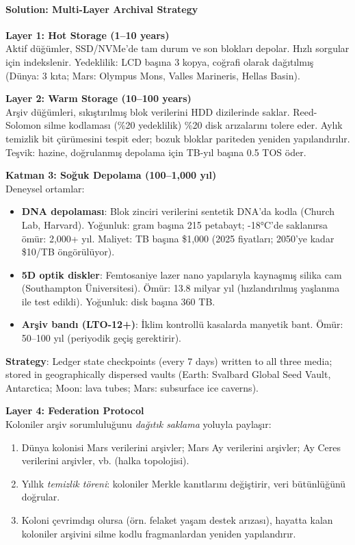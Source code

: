 \documentclass[11pt]{article}
\begin{document}
\paragraph{Solution: Multi-Layer Archival Strategy}

\textbf{Layer 1: Hot Storage (1--10 years)}\\
Aktif düğümler, SSD/NVMe'de tam durum ve son blokları depolar. Hızlı sorgular için indekslenir. Yedeklilik: LCD başına 3 kopya, coğrafi olarak dağıtılmış (Dünya: 3 kıta; Mars: Olympus Mons, Valles Marineris, Hellas Basin).

\textbf{Layer 2: Warm Storage (10--100 years)}\\
Arşiv düğümleri, sıkıştırılmış blok verilerini HDD dizilerinde saklar. Reed-Solomon silme kodlaması (\%20 yedeklilik) \%20 disk arızalarını tolere eder. Aylık temizlik bit çürümesini tespit eder; bozuk bloklar pariteden yeniden yapılandırılır. Teşvik: hazine, doğrulanmış depolama için TB-yıl başına 0.5 TOS öder.

\textbf{Katman 3: Soğuk Depolama (100--1,000 yıl)}\\
Deneysel ortamlar:
\begin{itemize}[noitemsep]
  \item \textbf{DNA depolaması}: Blok zinciri verilerini sentetik DNA'da kodla (Church Lab, Harvard). Yoğunluk: gram başına 215 petabayt; -18°C'de saklanırsa ömür: 2,000+ yıl. Maliyet: TB başına \$1,000 (2025 fiyatları; 2050'ye kadar \$10/TB öngörülüyor).
  \item \textbf{5D optik diskler}: Femtosaniye lazer nano yapılarıyla kaynaşmış silika cam (Southampton Üniversitesi). Ömür: 13.8 milyar yıl (hızlandırılmış yaşlanma ile test edildi). Yoğunluk: disk başına 360 TB.
  \item \textbf{Arşiv bandı (LTO-12+)}: İklim kontrollü kasalarda manyetik bant. Ömür: 50--100 yıl (periyodik geçiş gerektirir).
\end{itemize}
\textbf{Strategy}: Ledger state checkpoints (every 7 days) written to all three media; stored in geographically dispersed vaults (Earth: Svalbard Global Seed Vault, Antarctica; Moon: lava tubes; Mars: subsurface ice caverns).

\textbf{Layer 4: Federation Protocol}\\
Koloniler arşiv sorumluluğunu \emph{dağıtık saklama} yoluyla paylaşır:
\begin{enumerate}[noitemsep]
  \item Dünya kolonisi Mars verilerini arşivler; Mars Ay verilerini arşivler; Ay Ceres verilerini arşivler, vb. (halka topolojisi).
  \item Yıllık \emph{temizlik töreni}: koloniler Merkle kanıtlarını değiştirir, veri bütünlüğünü doğrular.
  \item Koloni çevrimdışı olursa (örn. felaket yaşam destek arızası), hayatta kalan koloniler arşivini silme kodlu fragmanlardan yeniden yapılandırır.
\end{enumerate}
\end{document}
